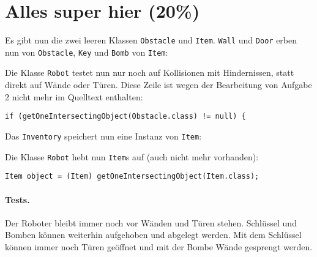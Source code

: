 \documentclass{../pi1-musterloesung}
\begin{document}

\section{Alles super hier (20\%)}

Es gibt nun die zwei leeren Klassen \texttt{Obstacle} und \texttt{Item}. \texttt{Wall} und \texttt{Door} erben nun von \texttt{Obstacle}, \texttt{Key} und \texttt{Bomb} von \texttt{Item}:






Die Klasse \texttt{Robot} testet nun nur noch auf Kollisionen mit Hindernissen, statt direkt auf Wände oder Türen. Diese Zeile ist wegen der Bearbeitung von Aufgabe 2 nicht mehr im Quelltext enthalten:

\begin{lstlisting}[firstnumber=55]
if (getOneIntersectingObject(Obstacle.class) != null) {
\end{lstlisting}

Das \texttt{Inventory} speichert nun eine Instanz von \texttt{Item}:





Die Klasse \texttt{Robot} hebt nun \texttt{Item}s auf (auch nicht mehr vorhanden):

\begin{lstlisting}[firstnumber=152]
                Item object = (Item) getOneIntersectingObject(Item.class);
\end{lstlisting}

\paragraph{Tests.} Der Roboter bleibt immer noch vor Wänden und Türen stehen. Schlüssel und Bomben können weiterhin aufgehoben und abgelegt werden. Mit dem Schlüssel können immer noch Türen geöffnet und mit der Bombe Wände gesprengt werden.
\end{document}
